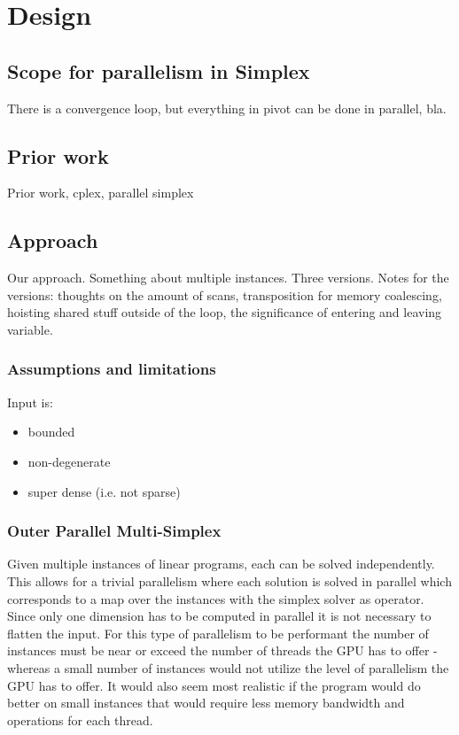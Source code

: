 \section{Design}

\subsection{Scope for parallelism in Simplex}
There is a convergence loop, but everything in pivot can be done in parallel, bla.

\subsection{Prior work}
Prior work, cplex, parallel simplex

\subsection{Approach}
Our approach. Something about multiple instances. Three versions. Notes for the versions: thoughts on the amount of scans, transposition for memory coalescing, hoisting shared stuff outside of the loop, the significance of entering and leaving variable.

\subsubsection{Assumptions and limitations}
Input is:
\begin{itemize}
\item bounded
\item non-degenerate
\item super dense (i.e. not sparse)
\end{itemize}

\subsubsection{Outer Parallel Multi-Simplex}
Given multiple instances of linear programs, each can be solved independently. This allows for a trivial parallelism where each solution is solved in parallel which corresponds to a map over the instances with the simplex solver as operator. Since only one dimension has to be computed in parallel it is not necessary to flatten the input. For this type of parallelism to be performant the number of instances must be near or exceed the number of threads the GPU has to offer - whereas a small number of instances would not utilize the level of parallelism the GPU has to offer. It would also seem most realistic if the program would do better on small instances that would require less memory bandwidth and operations for each thread.

